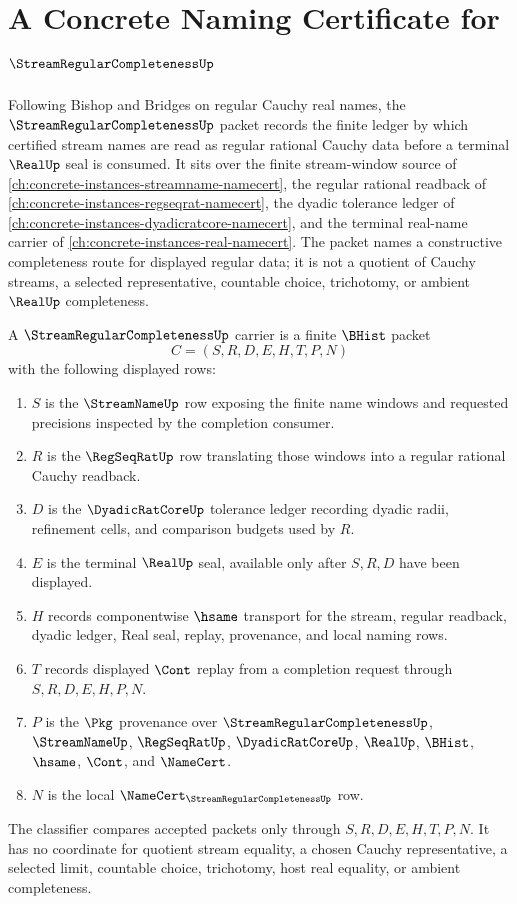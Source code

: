 \chapter{A Concrete Naming Certificate for $\StreamRegularCompletenessUp$}
\label{ch:concrete-instances-stream-regular-completeness-namecert}

Following Bishop and Bridges on regular Cauchy real names, the $\StreamRegularCompletenessUp$ packet records the finite ledger by which certified stream names are read as regular rational Cauchy data before a terminal $\RealUp$ seal is consumed. It sits over the finite stream-window source of \autoref{ch:concrete-instances-streamname-namecert}, the regular rational readback of \autoref{ch:concrete-instances-regseqrat-namecert}, the dyadic tolerance ledger of \autoref{ch:concrete-instances-dyadicratcore-namecert}, and the terminal real-name carrier of \autoref{ch:concrete-instances-real-namecert}. The packet names a constructive completeness route for displayed regular data; it is not a quotient of Cauchy streams, a selected representative, countable choice, trichotomy, or ambient $\RealUp$ completeness.

\begin{definition}
\label{def:stream-regular-completeness-ledger}
A $\StreamRegularCompletenessUp$ carrier is a finite $\BHist$ packet
$$
C=(S,R,D,E,H,T,P,N)
$$
with the following displayed rows:
\begin{enumerate}
\item $S$ is the $\StreamNameUp$ row exposing the finite name windows and requested precisions inspected by the completion consumer.
\item $R$ is the $\RegSeqRatUp$ row translating those windows into a regular rational Cauchy readback.
\item $D$ is the $\DyadicRatCoreUp$ tolerance ledger recording dyadic radii, refinement cells, and comparison budgets used by $R$.
\item $E$ is the terminal $\RealUp$ seal, available only after $S,R,D$ have been displayed.
\item $H$ records componentwise $\hsame$ transport for the stream, regular readback, dyadic ledger, Real seal, replay, provenance, and local naming rows.
\item $T$ records displayed $\Cont$ replay from a completion request through $S,R,D,E,H,P,N$.
\item $P$ is the $\Pkg$ provenance over $\StreamRegularCompletenessUp$, $\StreamNameUp$, $\RegSeqRatUp$, $\DyadicRatCoreUp$, $\RealUp$, $\BHist$, $\hsame$, $\Cont$, and $\NameCert$.
\item $N$ is the local $\NameCert_{\StreamRegularCompletenessUp}$ row.
\end{enumerate}
The classifier compares accepted packets only through $S,R,D,E,H,T,P,N$. It has no coordinate for quotient stream equality, a chosen Cauchy representative, a selected limit, countable choice, trichotomy, host real equality, or ambient completeness.
\end{definition}

